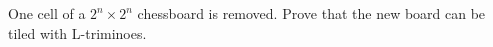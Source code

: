 One cell of a $2^n \times 2^n$ chessboard is removed. Prove that the new board can be tiled with L-triminoes.